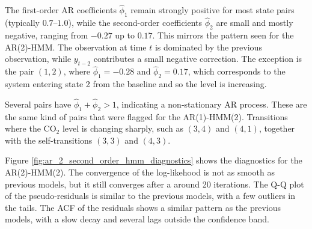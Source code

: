 The first-order AR coefficients $\hat{\phi}_1$ remain strongly positive for
most state pairs (typically $0.7$--$1.0$), while the second-order
coefficients $\hat{\phi}_2$ are small and mostly negative, ranging from
$-0.27$ up to $0.17$. This mirrors the pattern seen for the AR(2)-HMM. 
The observation at time $t$ is dominated by the previous observation,
while $y_{t-2}$ contributes a small negative correction. The exception is
the pair $(1,2)$, where $\hat{\phi}_1 = -0.28$ and $\hat{\phi}_2 = 0.17$,
which corresponds to the system entering state 2 from the baseline and so
the level is increasing.

Several pairs have $\hat{\phi}_1 + \hat{\phi}_2 > 1$, indicating a
non-stationary AR process. These are the same kind of pairs that were
flagged for the AR(1)-HMM(2). Transitions where the CO$_2$ level is
changing sharply, such as $(3,4)$ and $(4,1)$, together with the
self-transitions $(3,3)$ and $(4,3)$. 



Figure \ref{fig:ar_2_second_order_hmm_diagnostics} shows the diagnostics for
the AR(2)-HMM(2). The convergence of the log-likehood is not as smooth as 
previous models, but it still converges after a around 20 iterations. 
The Q-Q plot of the pseudo-residuals is similar to the previous models, with a few outliers in the tails. 
The ACF of the residuals shows a similar pattern as the previous models, with a slow decay and several lags outside the confidence band.

